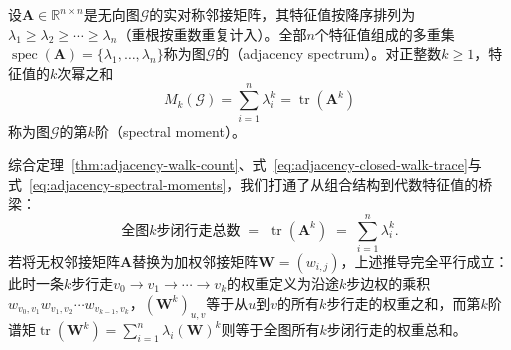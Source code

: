 \begin{definition}[谱矩]
\label{def:adjacency-spectrum}
设$\bm A\in\mathbb R^{n\times n}$是无向图$\mathcal G$的实对称邻接矩阵，其特征值按降序排列为$\lambda_1\ge\lambda_2\ge\cdots\ge\lambda_n$（重根按重数重复计入）。全部$n$个特征值组成的多重集$\operatorname{spec}(\bm A)=\{\lambda_1,\ldots,\lambda_n\}$称为图$\mathcal G$的（adjacency spectrum）。对正整数$k\geq 1$，特征值的$k$次幂之和
\[
M_k(\mathcal G)=\sum_{i=1}^n\lambda_i^k=\operatorname{tr}(\bm A^k)
\]
称为图$\mathcal G$的第$k$阶（spectral moment）。
\end{definition}

综合定理~\ref{thm:adjacency-walk-count}、式~\eqref{eq:adjacency-closed-walk-trace}与式~\eqref{eq:adjacency-spectral-moments}，我们打通了从组合结构到代数特征值的桥梁：
\[
\text{全图$k$步闭行走总数}
\;=\;\operatorname{tr}(\bm A^k)
\;=\;\sum_{i=1}^n\lambda_i^k.
\]
若将无权邻接矩阵$\bm A$替换为加权邻接矩阵$\bm W=(w_{i,j})$，上述推导完全平行成立：此时一条$k$步行走$v_0\to v_1\to\cdots\to v_k$的权重定义为沿途$k$步边权的乘积$w_{v_0,v_1}w_{v_1,v_2}\cdots w_{v_{k-1},v_k}$，$(\bm W^k)_{u,v}$等于从$u$到$v$的所有$k$步行走的权重之和，而第$k$阶谱矩$\operatorname{tr}(\bm W^k)=\sum_{i=1}^n\lambda_i(\bm W)^k$则等于全图所有$k$步闭行走的权重总和。
